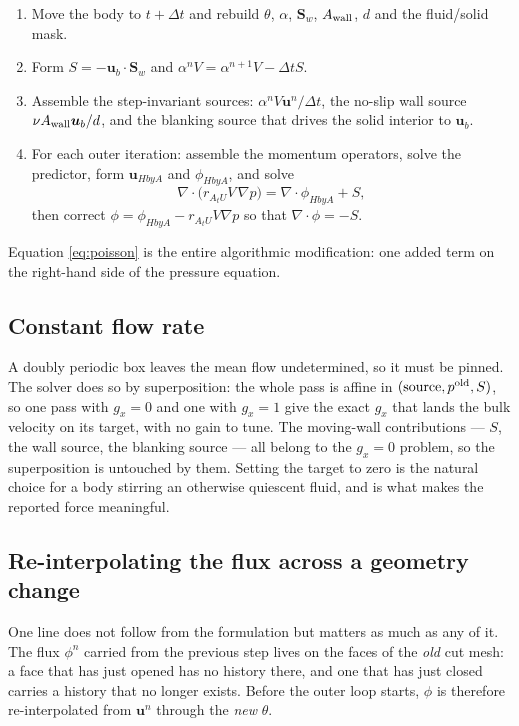 \documentclass[11pt,a4paper]{article}
\theoremstyle{remark}
\newcommand{\uu}{\bm{u}}
\newcommand{\Sw}{\bm{S}_w}
\newcommand{\ub}{\uu_b}
\newcommand{\dt}{\Delta t}
\begin{document}
\begin{enumerate}\itemsep2pt
\item Move the body to $t+\dt$ and rebuild $\theta$, $\alpha$, $\Sw$, $A_{\rm wall}$, $d$ and the
      fluid/solid mask.
\item Form $S=-\ub\!\cdot\!\Sw$ and $\alpha^{n}V=\alpha^{n+1}V-\dt S$.
\item Assemble the step-invariant sources: $\alpha^{n}V\uu^{n}/\dt$, the no-slip wall source
      $\nu A_{\rm wall}\ub/d$, and the blanking source that drives the solid interior to $\ub$.
\item For each outer iteration: assemble the momentum operators, solve the predictor, form
      $\uu_{HbyA}$ and $\phi_{HbyA}$, and solve
      \begin{equation}
      \nabla\!\cdot\!\big(r_{A_tU}V\,\nabla p\big)=\nabla\!\cdot\!\phi_{HbyA}+S ,
      \label{eq:poisson}
      \end{equation}
      then correct $\phi=\phi_{HbyA}-r_{A_tU}V\nabla p$ so that
      $\nabla\!\cdot\!\phi=-S$.
\end{enumerate}
Equation \eqref{eq:poisson} is the entire algorithmic modification: one added term on the
right-hand side of the pressure equation.

\subsection{Constant flow rate}

A doubly periodic box leaves the mean flow undetermined, so it must be pinned. The solver does so
by superposition: the whole pass is affine in $(\text{source},p^{\rm old},S)$, so one pass with
$g_x=0$ and one with $g_x=1$ give the exact $g_x$ that lands the bulk velocity on its target,
with no gain to tune. The moving-wall contributions --- $S$, the wall source, the blanking
source --- all belong to the $g_x=0$ problem, so the superposition is untouched by them. Setting
the target to zero is the natural choice for a body stirring an otherwise quiescent fluid, and is
what makes the reported force meaningful.

\subsection{Re-interpolating the flux across a geometry change}
\label{sec:reinterp}

One line does not follow from the formulation but matters as much as any of it. The flux
$\phi^{n}$ carried from the previous step lives on the faces of the \emph{old} cut mesh: a face
that has just opened has no history there, and one that has just closed carries a history that no
longer exists. Before the outer loop starts, $\phi$ is therefore re-interpolated from $\uu^{n}$
through the \emph{new} $\theta$.
\end{document}
